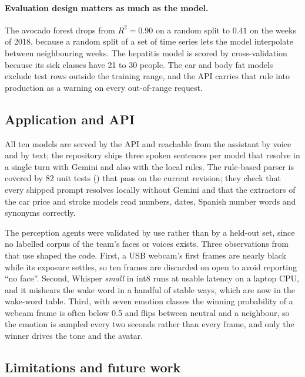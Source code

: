 \paragraph{Evaluation design matters as much as the model.}
The avocado forest drops from $R^2 = 0.90$ on a random split to $0.41$ on
the weeks of 2018, because a random split of a set of time series lets the
model interpolate between neighbouring weeks. The hepatitis model is scored
by cross-validation because its sick classes have 21 to 30 people. The car
and body fat models exclude test rows outside the training range, and the
API carries that rule into production as a warning on every out-of-range
request.

\subsection{Application and API}

All ten models are served by the API and reachable from the assistant by
voice and by text; the repository ships three spoken sentences per model
that resolve in a single turn with Gemini and also with the local rules.
The rule-based parser is covered by 82 unit tests
() that pass on the current revision; they
check that every shipped prompt resolves locally without Gemini and that the
extractors of the car price and stroke models read numbers, dates, Spanish
number words and synonyms correctly.

The perception agents were validated by use rather than by a held-out set,
since no labelled corpus of the team's faces or voices exists. Three
observations from that use shaped the code. First, a USB webcam's first
frames are nearly black while its exposure settles, so ten frames are
discarded on open to avoid reporting ``no face''. Second, Whisper
\emph{small} in int8 runs at usable latency on a laptop CPU, and it
mishears the wake word in a handful of stable ways, which are now in the
wake-word table. Third, with
seven emotion classes the winning probability of a webcam frame is often
below 0.5 and flips between neutral and a neighbour, so the emotion is
sampled every two seconds rather than every frame, and only the winner
drives the tone and the avatar.

\subsection{Limitations and future work}

